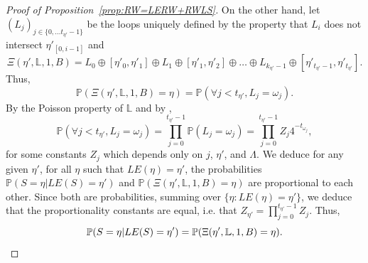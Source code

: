 \documentclass[11pt]{article}
\def\Att{{\Xi}}
\begin{document}
\begin{proof}[Proof of Proposition~\ref{prop:RW=LERW+RWLS}]
  On the other hand, let $(L_j)_{j\in \{0,\dots t_{\eta'}-1\}}$ be the loops uniquely defined by the property that
  $L_i$ does not intersect $\eta'_{[0,i-1]}$ and
  \[ \Att(\eta',\mathbb{L},1,B)= L_0\oplus [\eta'_0,\eta'_1]\oplus L_1\oplus [\eta'_1,\eta'_2]\oplus \dots \oplus L_{k_{\eta'}-1}\oplus [\eta'_{t_{\eta'}-1}, \eta'_{t_{\eta'}}]. \]
  Thus,
  \[\mathbb{P}( \Att(\eta',\mathbb{L},1,B)=\eta)
  = \mathbb{P}( \forall j<t_{\eta'}, L_j=\omega_j).\]
  By the Poisson property of $\mathbb{L}$ and by \cite[Proposition 9.4.1]{LawlerLimic},
  \[ \mathbb{P}( \forall j<t_{\eta'},  L_j=\omega_j)
  =\prod_{j=0}^{ t_{\eta'}-1  }\mathbb{P}( L_j=\omega_j) =\prod_{j=0}^{ t_{\eta'}-1  } Z_j 4^{- t_{\omega_j}  },
  \]
  for some constants $Z_j$ which depends only on $j$, $\eta'$, and $\Lambda$.
  We deduce for any given $\eta'$, for all $\eta$ such that $LE(\eta)=\eta'$, the probabilities
  $\mathbb{P}( S=\eta| LE(S)=\eta')$ and $\mathbb{P}( \Att(\eta',\mathbb{L},1,B)=\eta) $ are proportional to each other. Since both are probabilities, summing over $\{\eta: LE(\eta)=\eta'\}$, we deduce that the proportionality constants are equal, i.e. that $Z_{\eta'}=\prod_{j=0}^{ t_{\eta'}-1  } Z_j$. Thus,
  \[
  \mathbb{P}( S=\eta| LE(S)=\eta') = \mathbb{P}( \Att(\eta',\mathbb{L},1,B)=\eta).\qedhere
  \]
\end{proof}
\end{document}
